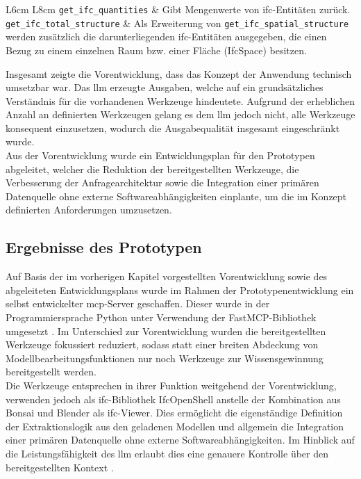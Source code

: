 \begin{table}[!htb]
\begin{tabular}{L{6cm} L{8cm}}
        \texttt{get\_ifc\_quantities} & Gibt Mengenwerte von \gls{ifc}-Entitäten zurück. \\

        \texttt{get\_ifc\_total\_structure} & Als Erweiterung von \texttt{get\_ifc\_spatial\_structure} werden zusätzlich die darunterliegenden \gls{ifc}-Entitäten ausgegeben, die einen Bezug zu einem einzelnen Raum bzw. einer Fläche (IfcSpace) besitzen. \\
        
        \hline
    \end{tabular}
\end{table} 

Insgesamt zeigte die Vorentwicklung, dass das Konzept der Anwendung technisch umsetzbar war. 
Das \gls{llm} erzeugte Ausgaben, welche auf ein grundsätzliches Verständnis für die vorhandenen Werkzeuge hindeutete.
Aufgrund der erheblichen Anzahl an definierten Werkzeugen gelang es dem \gls{llm} jedoch nicht, alle Werkzeuge konsequent einzusetzen,
wodurch die Ausgabequalität insgesamt eingeschränkt wurde. \\

Aus der Vorentwicklung wurde ein Entwicklungsplan für den Prototypen abgeleitet, welcher die Reduktion der bereitgestellten Werkzeuge, 
die Verbesserung der Anfragearchitektur sowie die Integration einer primären Datenquelle ohne externe Softwareabhängigkeiten einplante,
um die im Konzept definierten Anforderungen umzusetzen.

\subsection{Ergebnisse des Prototypen}

Auf Basis der im vorherigen Kapitel vorgestellten Vorentwicklung sowie des abgeleiteten Entwicklungsplans 
wurde im Rahmen der Prototypenentwicklung ein selbst entwickelter \gls{mcp}-Server geschaffen. 
Dieser wurde in der Programmiersprache Python unter Verwendung der FastMCP-Bibliothek umgesetzt \cite{gofastmcp2026welcome}.
Im Unterschied zur Vorentwicklung wurden die bereitgestellten Werkzeuge fokussiert reduziert, 
sodass statt einer breiten Abdeckung von Modellbearbeitungsfunktionen nur noch Werkzeuge zur Wissensgewinnung bereitgestellt werden. \\

Die Werkzeuge entsprechen in ihrer Funktion weitgehend der Vorentwicklung, verwenden jedoch als \gls{ifc}-Bibliothek IfcOpenShell anstelle der Kombination aus Bonsai und Blender als \gls{ifc}-Viewer. 
Dies ermöglicht die eigenständige Definition der Extraktionslogik aus den geladenen Modellen und allgemein die Integration einer primären Datenquelle ohne externe Softwareabhängigkeiten.
Im Hinblick auf die Leistungsfähigkeit des \gls{llm} erlaubt dies eine genauere Kontrolle über den bereitgestellten Kontext \cite{ifcopenshell_github}. \\

